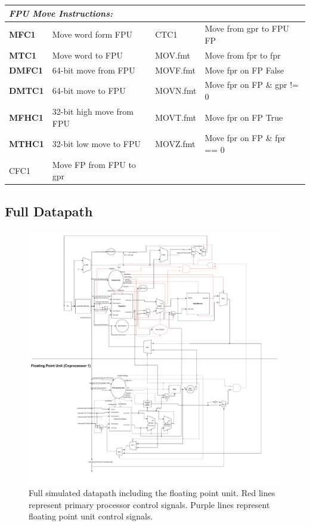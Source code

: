 \documentclass[
    paper=letter,
    parskip=half,
    fontsize=12pt,
    titlepage=firstiscover,
    toc=bibliography,
    numbers=endperiod
]{scrartcl}
\begin{document}
\begin{tabularx}{\textwidth}{lX|lX}
    \multicolumn{4}{l}{\emph{FPU Move Instructions:}} \\\hline
    \textbf{MFC1}  & Move word form FPU        & CTC1     & Move from gpr to FPU FP \\
    \textbf{MTC1}  & Move word to FPU          & MOV.fmt  & Move from fpr to fpr \\
    \textbf{DMFC1} & 64-bit move from FPU      & MOVF.fmt & Move fpr on FP False \\
    \textbf{DMTC1} & 64-bit move to FPU        & MOVN.fmt & Move fpr on FP \& gpr != 0 \\
    \textbf{MFHC1} & 32-bit high move from FPU & MOVT.fmt & Move fpr on FP True \\
    \textbf{MTHC1} & 32-bit low move to FPU    & MOVZ.fmt & Move fpr on FP \& fpr == 0 \\
    CFC1           & Move FP from FPU to gpr   &          & \\
\end{tabularx}

\subsection{Full Datapath}

\begin{figure}[H]
    \includegraphics[width=\textwidth]{swim-datapath}
    \caption{Full simulated datapath including the floating point unit. Red lines represent primary processor control signals. Purple lines represent floating point unit control signals.}
\end{figure}
\end{document}
